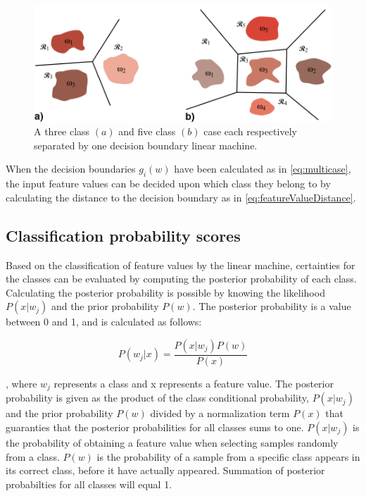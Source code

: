 \begin{figure}[H]                 
	\includegraphics[width=.6\textwidth]{figures/xBackground/LMregions}  
	\caption{A three class $(a)$ and five class $(b)$ case each respectively separated by one decision boundary linear machine. \cite{Duda2000}}
	\label{fig:LMregions} 
\end{figure}

When the decision boundaries $g_i(w)$ have been calculated as in \eqref{eq:multicase}, the input feature values can be decided upon which class they belong to by calculating the distance to the decision boundary as in \eqref{eq:featureValueDistance}. 




\subsection{Classification probability scores}
Based on the classification of feature values by the linear machine, certainties for the classes can be evaluated by computing the posterior probability of each class. Calculating the posterior probability is possible by knowing the likelihood $P(x|w_j)$ and the prior probability $P(w)$.
The posterior probability is a value between 0 and 1, and is calculated as follows:

\begin{equation}
P(w_j|x) = \frac{P(x|w_j)P(w)}{P(x)}
\end{equation}

, where $w_j$ represents a class and x represents a feature value. The posterior probability is given as the product of the class conditional probability, $P(x|w_j)$ and the prior probability $P(w)$ divided by a normalization term $P(x)$ that guaranties that the posterior probabilities for all classes sums to one. $P(x|w_j)$ is the probability of obtaining a feature value when selecting samples randomly from a class. $P(w)$ is the probability of a sample from a specific class appears in its correct class, before it have actually appeared. Summation of posterior probabilties for all classes will equal 1.
